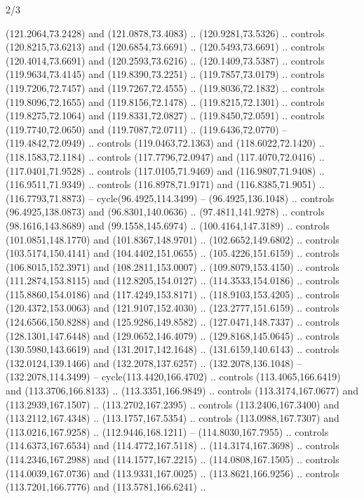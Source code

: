 \begin{flagdescription}{2/3}
\begin{scope}[shift={(0.5\flaglength,0.5)},scale=\flagwidth/320]
\begin{scope}[y=0.8pt, x=0.8pt, yscale=-1,shift={(-118.3,-146)}]
  (121.2064,73.2428) and (121.0878,73.4083) .. (120.9281,73.5326) .. controls
  (120.8215,73.6213) and (120.6854,73.6691) .. (120.5493,73.6691) .. controls
  (120.4014,73.6691) and (120.2593,73.6216) .. (120.1409,73.5387) .. controls
  (119.9634,73.4145) and (119.8390,73.2251) .. (119.7857,73.0179) .. controls
  (119.7206,72.7457) and (119.7267,72.4555) .. (119.8036,72.1832) .. controls
  (119.8096,72.1655) and (119.8156,72.1478) .. (119.8215,72.1301) .. controls
  (119.8275,72.1064) and (119.8331,72.0827) .. (119.8450,72.0591) .. controls
  (119.7740,72.0650) and (119.7087,72.0711) .. (119.6436,72.0770) --
  (119.4842,72.0949) .. controls (119.0463,72.1363) and (118.6022,72.1420) ..
  (118.1583,72.1184) .. controls (117.7796,72.0947) and (117.4070,72.0416) ..
  (117.0401,71.9528) .. controls (117.0105,71.9469) and (116.9807,71.9408) ..
  (116.9511,71.9349) .. controls (116.8978,71.9171) and (116.8385,71.9051) ..
  (116.7793,71.8873) -- cycle(96.4925,114.3499) -- (96.4925,136.1048) ..
  controls (96.4925,138.0873) and (96.8301,140.0636) .. (97.4811,141.9278) ..
  controls (98.1616,143.8689) and (99.1558,145.6974) .. (100.4164,147.3189) ..
  controls (101.0851,148.1770) and (101.8367,148.9701) .. (102.6652,149.6802) ..
  controls (103.5174,150.4141) and (104.4402,151.0655) .. (105.4226,151.6159) ..
  controls (106.8015,152.3971) and (108.2811,153.0007) .. (109.8079,153.4150) ..
  controls (111.2874,153.8115) and (112.8205,154.0127) .. (114.3533,154.0186) ..
  controls (115.8860,154.0186) and (117.4249,153.8171) .. (118.9103,153.4205) ..
  controls (120.4372,153.0063) and (121.9107,152.4030) .. (123.2777,151.6159) ..
  controls (124.6566,150.8288) and (125.9286,149.8582) .. (127.0471,148.7337) ..
  controls (128.1301,147.6448) and (129.0652,146.4079) .. (129.8168,145.0645) ..
  controls (130.5980,143.6619) and (131.2017,142.1648) .. (131.6159,140.6143) ..
  controls (132.0124,139.1466) and (132.2078,137.6257) .. (132.2078,136.1048) --
  (132.2078,114.3499) -- cycle(113.4420,166.4702) .. controls
  (113.4065,166.6419) and (113.3706,166.8133) .. (113.3351,166.9849) .. controls
  (113.3174,167.0677) and (113.2939,167.1507) .. (113.2702,167.2395) .. controls
  (113.2406,167.3400) and (113.2112,167.4348) .. (113.1757,167.5354) .. controls
  (113.0988,167.7307) and (113.0216,167.9258) .. (112.9446,168.1211) --
  (114.8030,167.7955) .. controls (114.6373,167.6534) and (114.4772,167.5118) ..
  (114.3174,167.3698) .. controls (114.2346,167.2988) and (114.1577,167.2215) ..
  (114.0808,167.1505) .. controls (114.0039,167.0736) and (113.9331,167.0025) ..
  (113.8621,166.9256) .. controls (113.7201,166.7776) and (113.5781,166.6241) ..

\end{scope}
\end{scope}
\end{flagdescription}
